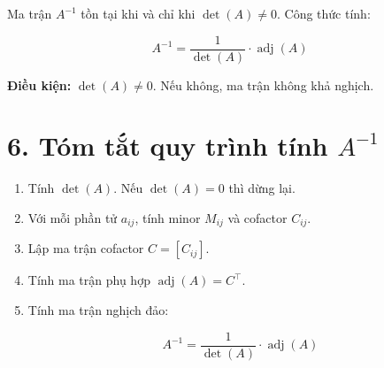 \documentclass[12pt,a4paper]{article}
\begin{document}
Ma trận $A^{-1}$ tồn tại khi và chỉ khi $\det(A) \neq 0$. Công thức tính:

\[
A^{-1} = \frac{1}{\det(A)} \cdot \operatorname{adj}(A)
\]

\textbf{Điều kiện:} $\det(A) \ne 0$. Nếu không, ma trận không khả nghịch.

\section*{6. Tóm tắt quy trình tính $A^{-1}$}

\begin{enumerate}
    \item Tính $\det(A)$. Nếu $\det(A) = 0$ thì dừng lại.
    \item Với mỗi phần tử $a_{ij}$, tính minor $M_{ij}$ và cofactor $C_{ij}$.
    \item Lập ma trận cofactor $C = [C_{ij}]$.
    \item Tính ma trận phụ hợp $\operatorname{adj}(A) = C^\top$.
    \item Tính ma trận nghịch đảo:

    \[
    A^{-1} = \frac{1}{\det(A)} \cdot \operatorname{adj}(A)
    \]
\end{enumerate}
\end{document}
